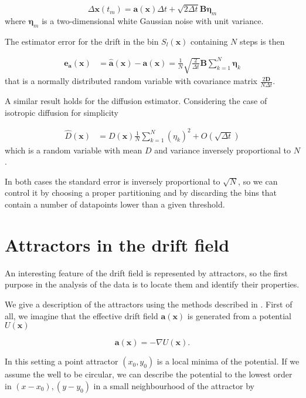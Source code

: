 \documentclass[14pt,a4paper]{article}
\begin{document}
\begin{equation}
\Delta \bm{x}(t_m) = \bm{a}(\bm{x}) \Delta t + \sqrt{2 \Delta t} \bm{B} \bm{\eta}_m
\end{equation}
where $\bm{\eta}_m$ is a two-dimensional white Gaussian noise with unit variance.

The estimator error for the drift in the bin $S_l(\bm{x})$ containing $N$ steps is then

\begin{align}
\bm{e_a}(\bm{x}) &= \hat{\bm{a}}(\bm{x}) - \bm{a}(\bm{x}) = \frac{1}{N} \sqrt{\frac{2}{\Delta t}} \bm{B} \sum_{k = 1}^N \bm{\eta}_k
\end{align}
that is a normally distributed random variable with covariance matrix $\frac{2 \bm{D}}{N \Delta t}$.

A similar result holds for the diffusion estimator. Considering the case of isotropic diffusion for simplicity

\begin{align}
\hat{D}(\bm{x}) &= D(\bm{x}) \frac{1}{N} \sum_{k = 1}^N \left(\eta_k\right)^2 + O(\sqrt{\Delta t})
\end{align}
which is a random variable with mean $D$ and variance inversely proportional to $N$.

In both cases the standard error is inversely proportional to $\sqrt{N}$, so we can control it by choosing a proper partitioning and by discarding the bins that contain a number of datapoints lower than a given threshold.


\section{Attractors in the drift field}

An interesting feature of the drift field is represented by attractors, so the first purpose in the analysis of the data is to locate them and identify their properties.

We give a description of the attractors using the methods described in \cite{hoze2012}. First of all, we imagine that the effective drift field $\bm{a}(\bm{x})$ is generated from a potential $U(\bm{x})$

\begin{equation}
\bm{a}(\bm{x}) = -\nabla U(\bm{x}).
\end{equation}

In this setting a point attractor $(x_0, y_0)$ is a local minima of the potential. If we assume the well to be circular, we can describe the potential to the lowest order in $(x - x_0), (y - y_0)$ in a small neighbourhood of the attractor by
\end{document}
